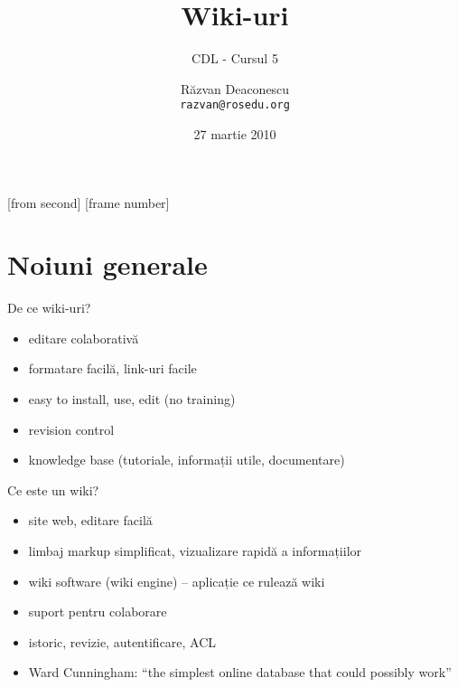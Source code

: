 \documentclass{beamer}
\title[Wiki-uri]{Wiki-uri}
\subtitle{CDL - Cursul 5}
\institute[ROSEdu]{ROSEdu}
\date{27 martie 2010}
\author{Răzvan Deaconescu \\ \texttt{razvan@rosedu.org}}
\begin{document}
[from second]
[frame number]

\frame{\titlepage}

\frame{\tableofcontents}


\section{Noiuni generale}

\frame{\tableofcontents[currentsection]}


\begin{frame}{De ce wiki-uri?}
  \begin{itemize}
    \item editare colaborativă
    \item formatare facilă, link-uri facile
    \item easy to install, use, edit (no training)
    \item revision control
    \item knowledge base (tutoriale, informații utile, documentare)
  \end{itemize}
\end{frame}

\begin{frame}{Ce este un wiki?}
  \begin{itemize}
    \item site web, editare facilă
    \item limbaj markup simplificat, vizualizare rapidă a informațiilor
    \item wiki software (wiki engine) -- aplicație ce rulează wiki
    \item suport pentru colaborare
    \item istoric, revizie, autentificare, ACL
    \item Ward Cunningham: ``the simplest online database that could possibly
work''
  \end{itemize}
\end{frame}
\end{document}
